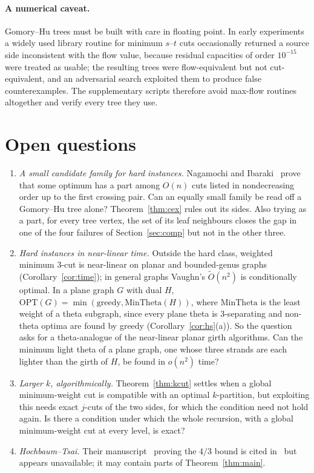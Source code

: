 \documentclass[preprint,12pt]{elsarticle}
\theoremstyle{definition}
\newcommand{\OPT}{\mathrm{OPT}}
\newcommand{\greedy}{\mathrm{greedy}}
\begin{document}
\paragraph{A numerical caveat.}
Gomory--Hu trees must be built with care in floating point. In early experiments a widely used library
routine for minimum $s$--$t$ cuts occasionally returned a source side inconsistent with the flow value,
because residual capacities of order $10^{-15}$ were treated as usable; the resulting trees were
flow-equivalent but not cut-equivalent, and an adversarial search exploited them to produce false
counterexamples. The supplementary scripts therefore avoid max-flow routines altogether and verify
every tree they use.

\section{Open questions}

\begin{enumerate}[leftmargin=*]
\item \emph{A small candidate family for hard instances.} Nagamochi and Ibaraki~\cite{NagamochiIbaraki2000}
  prove that some optimum has a part among $O(n)$ cuts listed in nondecreasing order up to the first
  crossing pair. Can an equally small family be read off a Gomory--Hu tree alone? Theorem~\ref{thm:cex}
  rules out its sides. Also trying as a part, for every tree vertex, the set of its leaf neighbours
  closes the gap in one of the four failures of Section~\ref{sec:comp} but not in the other three.
\item \emph{Hard instances in near-linear time.} Outside the hard class, weighted minimum 3-cut is
  near-linear on planar and bounded-genus graphs (Corollary~\ref{cor:time}); in general graphs Vaughn's
  $\tilde O(n^2)$ is conditionally optimal. In a plane graph $G$ with dual $H$,
  $\OPT(G)=\min(\greedy,\mathrm{MinTheta}(H))$, where $\mathrm{MinTheta}$ is the least weight of a
  theta subgraph, since every plane theta is 3-separating and non-theta optima are found by greedy
  (Corollary~\ref{cor:hs}(a)). So the question asks for a theta-analogue of the near-linear planar
  girth algorithms. Can the minimum light theta of a plane graph, one whose three strands are each
  lighter than the girth of $H$, be found in $o(n^2)$ time?
\item \emph{Larger $k$, algorithmically.} Theorem~\ref{thm:kcut} settles when a global minimum-weight
  cut is compatible with an optimal $k$-partition, but exploiting this needs exact $j$-cuts of the two
  sides, for which the condition need not hold again. Is there a condition under which the whole
  recursion, with a global minimum-weight cut at every level, is exact?
\item \emph{Hochbaum--Tsai.} Their manuscript~\cite{HochbaumTsai1983} proving the $4/3$ bound is cited
  in~\cite{HochbaumShmoys1985} but appears unavailable; it may contain parts of Theorem~\ref{thm:main}.
\end{enumerate}
\end{document}
